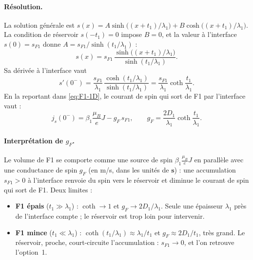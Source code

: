 \documentclass[11pt,a4paper]{article}
\newcommand{\vs}{\bm{s}}
\begin{document}
\paragraph{Résolution.} La solution générale est
$s(x) = A\sinh\big((x+t_1)/\lambda_1\big) + B\cosh\big((x+t_1)/\lambda_1\big)$.
La condition de réservoir $s(-t_1)=0$ impose $B=0$, et la valeur à
l'interface $s(0) = s_{F1}$ donne $A = s_{F1}/\sinh(t_1/\lambda_1)$ :
\begin{equation}
  s(x) = s_{F1}\,\frac{\sinh\!\big((x+t_1)/\lambda_1\big)}{\sinh(t_1/\lambda_1)}.
\end{equation}
Sa dérivée à l'interface vaut
\begin{equation}
  s'(0^-) = \frac{s_{F1}}{\lambda_1}\,
  \frac{\cosh(t_1/\lambda_1)}{\sinh(t_1/\lambda_1)}
  = \frac{s_{F1}}{\lambda_1}\coth\frac{t_1}{\lambda_1}.
\end{equation}
En la reportant dans \eqref{eq:F1-1D}, le courant de spin qui sort de F1 par
l'interface vaut :
\begin{equation}
  j_s(0^-) = \beta_1\frac{\mu_B}{e}J - g_F\,s_{F1},
  \qquad
  g_F = \frac{2D_1}{\lambda_1}\coth\frac{t_1}{\lambda_1}.
  \label{eq:gF}
\end{equation}

\paragraph{Interprétation de $g_F$.} Le volume de F1 se comporte comme une
source de spin $\beta_1\frac{\mu_B}{e}J$ en parallèle avec une conductance
de spin $g_F$ (en m/s, dans les unités de $\vs$) : une accumulation
$s_{F1}>0$ à l'interface renvoie du spin vers le réservoir et diminue le
courant de spin qui sort de F1. Deux limites :
\begin{itemize}
  \item \textbf{F1 épais} ($t_1\gg\lambda_1$) : $\coth\to1$ et
    $g_F\to 2D_1/\lambda_1$. Seule une épaisseur $\lambda_1$ près de
    l'interface compte ; le réservoir est trop loin pour intervenir.
  \item \textbf{F1 mince} ($t_1\ll\lambda_1$) : $\coth(t_1/\lambda_1)\approx
    \lambda_1/t_1$ et $g_F\approx 2D_1/t_1$, très grand. Le réservoir,
    proche, court-circuite l'accumulation : $s_{F1}\to0$, et l'on retrouve
    l'option~1.
\end{itemize}
\end{document}
